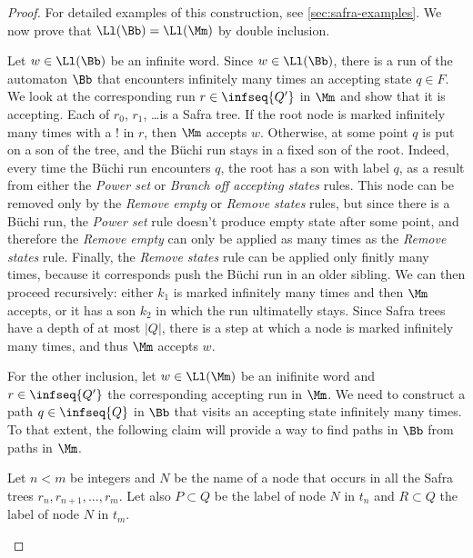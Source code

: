 \begin{proof}
    For detailed examples of this construction, see \autoref{sec:safra-examples}.
    We now prove that $\Ll(\Bb) = \Ll(\Mm)$ by double inclusion.

    Let $w \in \Ll(\Bb)$ be an infinite word.
    Since $w \in \Ll(\Bb)$, there is a run of the automaton $\Bb$
    that encounters infinitely many times an accepting state $q \in F$.
    We look at the corresponding run $r \in \infseq{Q'}$ in $\Mm$ and show that it
    is accepting. Each of $r_0$, $r_1$, \dots is a Safra tree.
    If the root node is marked infinitely many times with a
    $!$ in $r$, then $\Mm$ accepts $w$.
    Otherwise, at some point $q$ is put on
    a son of the tree, and the Büchi run stays in a fixed
    son of the root.
    Indeed, every time the Büchi run encounters $q$,
    the root has a son with label $q$, as a result from
    either the \textit{Power set} or \textit{Branch off accepting states}
    rules. This node can be removed only by the \textit{Remove empty}
    or \textit{Remove states} rules, but since there is a Büchi run,
    the \textit{Power set} rule doesn't produce empty state after some point,
    and therefore the \textit{Remove empty} can only be applied as many times
    as the \textit{Remove states} rule. Finally, the \textit{Remove states}
    rule can be applied only finitly many times, because it corresponds
    push the Büchi run in an older sibling.
    We can then proceed recursively: either $k_1$ is marked infinitely
    many times and then $\Mm$ accepts, or it has a son $k_2$ in which the run ultimatelly stays.
    Since Safra trees have a depth of at most $|Q|$, there is a step
    at which a node is marked infinitely many times, and thus $\Mm$ accepts
    $w$.

    For the other inclusion, let $w \in \Ll(\Mm)$ be an inifinite word
    and $r \in \infseq{Q'}$ the corresponding accepting run in $\Mm$.
    We need to construct a path
    $q \in \infseq{Q}$ in $\Bb$ that visits
    an accepting state infinitely many times.
    To that extent, the following claim will provide a
    way to find paths in $\Bb$ from paths in $\Mm$.

    \begin{claim}
        Let $n < m$ be integers and $N$ be the name of a node
        that occurs in all the Safra trees $r_n, r_{n+1}, \dots, r_m$.
        Let also $P \subset Q$ be the label of node $N$ in $t_n$
        and $R \subset Q$ the label of node $N$ in $t_m$.


\end{claim}
\end{proof}
